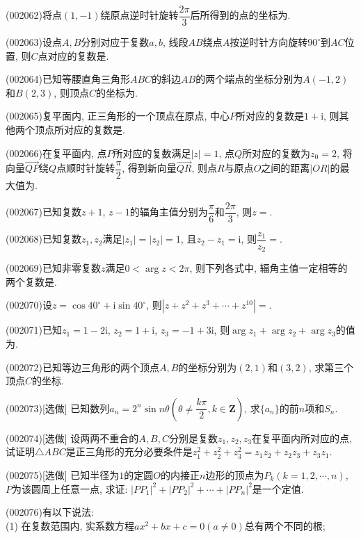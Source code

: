 \item (002062)将点$(1,-1)$绕原点逆时针旋转$\dfrac{2\pi}{3}$后所得到的点的坐标为.
\item (002063)设点$A,B$分别对应于复数$a,b$, 线段$AB$绕点$A$按逆时针方向旋转$90^\circ$到$AC$位置, 则$C$点对应的复数是.
\item (002064)已知等腰直角三角形$ABC$的斜边$AB$的两个端点的坐标分别为$A(-1,2)$和$B(2,3)$, 则顶点$C$的坐标为.
\item (002065)复平面内, 正三角形的一个顶点在原点, 中心$P$所对应的复数是$1+\mathrm{i}$, 则其他两个顶点所对应的复数是.
\item (002066)在复平面内, 点$P$所对应的复数满足$|z|=1$, 点$Q$所对应的复数为$z_0=2$, 将向量$\overrightarrow{QP}$绕$Q$点顺时针旋转$\dfrac{\pi}{2}$, 得到新向量$\overrightarrow{QR}$, 则点$R$与原点$O$之间的距离$|OR|$的最大值为.
\item (002067)已知复数$z+1$, $z-1$的辐角主值分别为$\dfrac{\pi}{6}$和$\dfrac{2\pi}{3}$, 则$z=$.
\item (002068)已知复数$z_1,z_2$满足$|z_1|=|z_2|=1$, 且$z_2-z_1=\mathrm{i}$, 则$\dfrac{z_1}{z_2}=$.
\item (002069)已知非零复数$z$满足$0<\arg z<2\pi$, 则下列各式中, 辐角主值一定相等的两个复数是.
\item (002070)设$z=\cos 40^\circ+\mathrm{i} \sin 40^\circ$, 则$|z+z^2+z^3+\cdots+z^{10}|=$.
\item (002071)已知$z_1=1-2\mathrm{i}$, $z_2=1+\mathrm{i}$, $z_3=-1+3\mathrm{i}$, 则$\arg z_1+\arg z_2+\arg z_3$的值为.
\item (002072)已知等边三角形的两个顶点$A,B$的坐标分别为$(2,1)$和$(3,2)$, 求第三个顶点$C$的坐标.
\item (002073)[选做]
已知数列$a_n=2^n\sin n\theta(\theta\neq\dfrac{k\pi}{2},k\in\mathbf{Z})$, 求$\{a_n\}$的前$n$项和$S_n$.
\item (002074)[选做]
设两两不重合的$A,B,C$分别是复数$z_1,z_2,z_3$在复平面内所对应的点, 试证明$\triangle ABC$是正三角形的充分必要条件是$z_1^2+z_2^2+z_3^2=z_1z_2+z_2z_3+z_3z_1$.
\item (002075)[选做]
已知半径为$1$的定圆$O$的内接正$n$边形的顶点为$P_k(k=1,2,\cdots,n)$, $P$为该圆周上任意一点, 求证: $|PP_1|^2+|PP_2|^2+\cdots+|PP_n|^2$是一个定值.
\item (002076)有以下说法:\\ 
(1) 在复数范围内, 实系数方程$ax^2+bx+c=0(a\neq 0)$总有两个不同的根;\\ 

